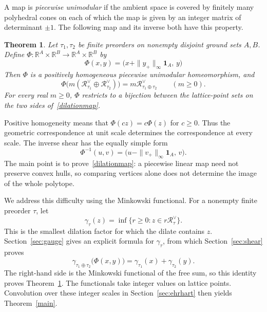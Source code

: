 \documentclass[11pt,reqno]{amsart}
\numberwithin{equation}{section}
\newtheorem{theorem}{Theorem}[section]
\theoremstyle{definition}
\theoremstyle{remark}
\theoremstyle{definition}
\newcommand{\Rpoly}[1]{\mathcal R_{#1}^{\vee}}
\begin{document}
A map is \emph{piecewise unimodular} if the ambient space is covered by finitely many polyhedral cones on each of which the map is given by an integer matrix of determinant $\pm1$. The following map and its inverse both have this property.

\begin{theorem}\label{geometric}
Let $\tau_1,\tau_2$ be finite preorders on nonempty disjoint ground sets $A,B$. Define
$\Phi:\mathbb R^A\times\mathbb R^B\to\mathbb R^A\times\mathbb R^B$ by
\begin{equation}\label{shearmap}
 \Phi(x,y)=\bigl(x+\|y_+\|_\infty\mathbf1_A,\,y\bigr)
\end{equation}
Then $\Phi$ is a positively homogeneous piecewise unimodular homeomorphism, and
\begin{equation}\label{dilationmap}
 \Phi\bigl(m(\Rpoly{\tau_1}\oplus\Rpoly{\tau_2})\bigr)
       =m\Rpoly{\tau_1\oplus\tau_2}
       \qquad(m\ge0).
\end{equation}
For every real $m\ge0$, $\Phi$ restricts to a bijection between the lattice-point sets on the two sides of~\eqref{dilationmap}.
\end{theorem}
Positive homogeneity means that $\Phi(cz)=c\Phi(z)$ for $c\ge0$. Thus the geometric correspondence at unit scale determines the correspondence at every scale. The inverse shear has the equally simple form
\[
 \Phi^{-1}(u,v)=\bigl(u-\|v_+\|_\infty\mathbf1_A,\,v\bigr).
\]
The main point is to prove~\eqref{dilationmap}: a piecewise linear map need not preserve convex hulls, so comparing vertices alone does not determine the image of the whole polytope.

We address this difficulty using the Minkowski functional. For a nonempty finite preorder $\tau$, let
\[
 \gamma_\tau(z)=\inf\{r\ge0:z\in r\Rpoly{\tau}\}.
\]
This is the smallest dilation factor for which the dilate contains $z$. Section~\ref{sec:gauge} gives an explicit formula for $\gamma_\tau$, from which Section~\ref{sec:shear} proves
\begin{equation}\label{introidentity}
 \gamma_{\tau_1\oplus\tau_2}\bigl(\Phi(x,y)\bigr)
       =\gamma_{\tau_1}(x)+\gamma_{\tau_2}(y).
\end{equation}
The right-hand side is the Minkowski functional of the free sum, so this identity proves Theorem~\ref{geometric}. The functionals take integer values on lattice points. Convolution over these integer scales in Section~\ref{sec:ehrhart} then yields Theorem~\ref{main}.
\end{document}
